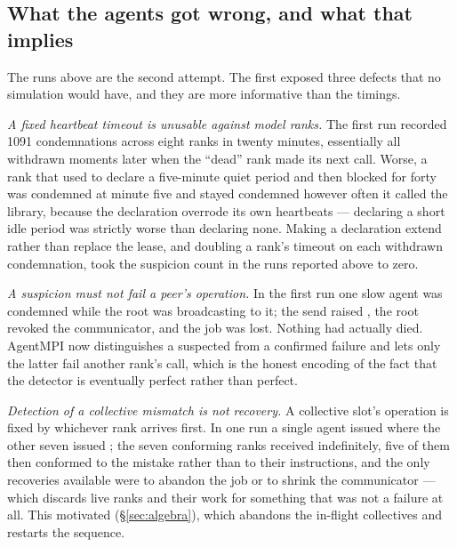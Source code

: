 \subsection{What the agents got wrong, and what that implies}
\label{sec:eval-conformance}

The runs above are the second attempt.  The first exposed three defects that no
simulation would have, and they are more informative than the timings.

\emph{A fixed heartbeat timeout is unusable against model ranks.}  The first
run recorded 1091 condemnations across eight ranks in twenty minutes,
essentially all withdrawn moments later when the ``dead'' rank made its next
call.  Worse, a rank that used  to declare a five-minute
quiet period and then blocked for forty was condemned at minute five and stayed
condemned however often it called the library, because the declaration
overrode its own heartbeats --- declaring a short idle period was strictly worse
than declaring none.  Making a declaration extend rather than replace the
lease, and doubling a rank's timeout on each withdrawn condemnation, took the
suspicion count in the runs reported above to zero.

\emph{A suspicion must not fail a peer's operation.}  In the first run one slow
agent was condemned while the root was broadcasting to it; the send raised
, the root revoked the communicator, and the job
was lost.  Nothing had actually died.  AgentMPI now distinguishes a suspected
from a confirmed failure and lets only the latter fail another rank's call,
which is the honest encoding of the fact that the detector is eventually
perfect rather than perfect.

\emph{Detection of a collective mismatch is not recovery.}  A collective slot's
operation is fixed by whichever rank arrives first.  In one run a single agent
issued  where the other seven issued ; the seven
conforming ranks received  indefinitely,
five of them then conformed to the mistake rather than to their instructions,
and the only recoveries available were to abandon the job or to shrink the
communicator --- which discards live ranks and their work for something that was
not a failure at all.  This motivated 
(\S\ref{sec:algebra}), which abandons the in-flight collectives and restarts
the sequence.

